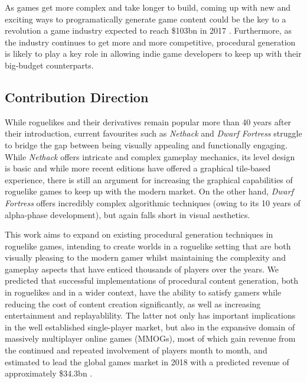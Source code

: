 \documentclass[12pt,a4paper]{article}
\begin{document}

As games get more complex and take longer to build, coming up with new and exciting ways to programatically generate game content could be the key to a revolution a game industry expected to reach \$103bn in 2017 \cite{newzoo}. Furthermore, as the industry continues to get more and more competitive, procedural generation is likely to play a key role in allowing indie game developers to keep up with their big-budget counterparts.

\subsection{Contribution Direction}

While roguelikes and their derivatives remain popular more than 40 years after their introduction, current favourites such as \emph{Nethack} and \emph{Dwarf Fortress} struggle to bridge the gap between being visually appealing and functionally engaging. While \emph{Nethack} offers intricate and complex gameplay mechanics, its level design is basic and while more recent editions have offered a graphical tile-based experience, there is still an argument for increasing the graphical capabilities of roguelike games to keep up with the modern market. On the other hand, \emph{Dwarf Fortress} offers incredibly complex algorithmic techniques (owing to its 10 years of alpha-phase development), but again falls short in visual aesthetics. 

This work aims to expand on existing procedural generation techniques in roguelike games, intending to create worlds in a roguelike setting that are both visually pleasing to the modern gamer whilst maintaining the complexity and gameplay aspects that have enticed thousands of players over the years. We predicted that successful implementations of procedural content generation, both in roguelikes and in a wider context, have the ability to satisfy gamers while reducing the cost of content creation significantly, as well as increasing entertainment and replayablility. The latter not only has important implications in the well established single-player market, but also in the expansive domain of massively multiplayer online games (MMOGs), most of which gain revenue from the continued and repeated involvement of players month to month, and estimated to lead the global games market in 2018 with a predicted revenue of approximately \$34.3bn \cite{newzoo}. 
\end{document}
